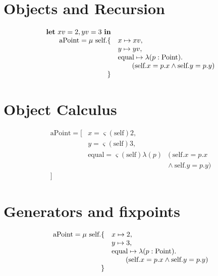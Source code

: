 \documentclass[12pt]{amsart}
\begin{document}
\section*{Objects and Recursion}
\newcommand{\self}{\textrm{self}}
\[
\begin{array}{rl}
\textbf{let}~xv = 2, yv = 3~\textbf{in} \\
\textrm{aPoint} = \mu~\self. \{ & x \mapsto xv,\\
& y \mapsto yv,\\
&\textrm{equal} \mapsto \lambda(p : \Point). \\
& \qquad (\self.x = p.x \wedge \self.y = p.y) \\
\}
\end{array}
\]
\newpage
\section*{Object Calculus}
\[
\begin{array}{rll}
\textrm{aPoint} = [
& x = \varsigma(\self) 2, \\
& y = \varsigma(\self) 3, \\
& \textrm{equal} = \varsigma(\self) \lambda(p) & (~\self.x = p.x \\
&&\wedge~\self.y = p.y) \\
]
\end{array}
\]
\newpage
\section*{Generators and fixpoints}
\[
\begin{array}{rl}
\textrm{aPoint} = \mu~\self. \{ & x \mapsto 2,\\
& y \mapsto 3,\\
&\textrm{equal} \mapsto \lambda(p : \Point). \\
& \qquad (\self.x = p.x \wedge \self.y = p.y) \\
\}
\end{array}
\]
\newpage
\end{document}
